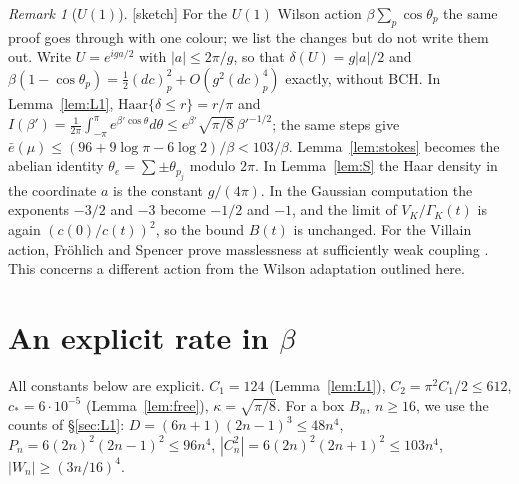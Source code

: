 \documentclass[11pt,a4paper]{article}
\theoremstyle{plain}
\theoremstyle{definition}
\theoremstyle{remark}
\newtheorem{remark}[theorem]{Remark}
\numberwithin{equation}{section}
\newcommand{\st}[1]{\textsf{[#1]}}
\begin{document}
\begin{remark}[$U(1)$]\label{rem:U1}
\st{sketch} For the $U(1)$ Wilson action $\beta\sum_p\cos\theta_p$ the same proof goes through with one colour; we list the changes but
do not write them out. Write $U=e^{iga/2}$ with $|a|\le2\pi/g$, so that $\delta(U)=g|a|/2$ and $\beta(1-\cos\theta_p)=\frac12(dc)_p^2+O(g^2(dc)_p^4)$
exactly, without BCH. In Lemma~\ref{lem:L1}, $\mathrm{Haar}\{\delta\le r\}=r/\pi$ and
$I(\beta')=\frac1{2\pi}\int_{-\pi}^{\pi}e^{\beta'\cos\theta}d\theta\le e^{\beta'}\sqrt{\pi/8}\,\beta'^{-1/2}$; the same steps give
$\bar e(\mu)\le(96+9\log\pi-6\log2)/\beta<103/\beta$. Lemma~\ref{lem:stokes} becomes the abelian identity $\theta_e=\sum\pm\theta_{p_j}$
modulo $2\pi$. In Lemma~\ref{lem:S} the Haar density in the coordinate $a$ is the constant $g/(4\pi)$. In the Gaussian computation the
exponents $-3/2$ and $-3$ become $-1/2$ and $-1$, and the limit of $V_K/\Gamma_K(t)$ is again $(c(0)/c(t))^2$, so the bound $B(t)$ is
unchanged. For the Villain action, Fr\"ohlich and Spencer prove masslessness at sufficiently weak coupling \cite[\S2.11]{FS82}.
This concerns a different action from the Wilson adaptation outlined here.
\end{remark}

\section{An explicit rate in $\beta$}\label{sec:rate}

All constants below are explicit. $C_1=124$ (Lemma~\ref{lem:L1}), $C_2=\pi^2C_1/2\le612$, $c_*=6\cdot10^{-5}$ (Lemma~\ref{lem:free}),
$\kappa=\sqrt{\pi/8}$. For a box $B_n$, $n\ge16$, we use the counts of \S\ref{sec:L1}: $D=(6n+1)(2n-1)^3\le48n^4$,
$P_n=6(2n)^2(2n-1)^2\le96n^4$, $|C^2_n|=6(2n)^2(2n+1)^2\le103n^4$, $|W_n|\ge(3n/16)^4$.
\end{document}
